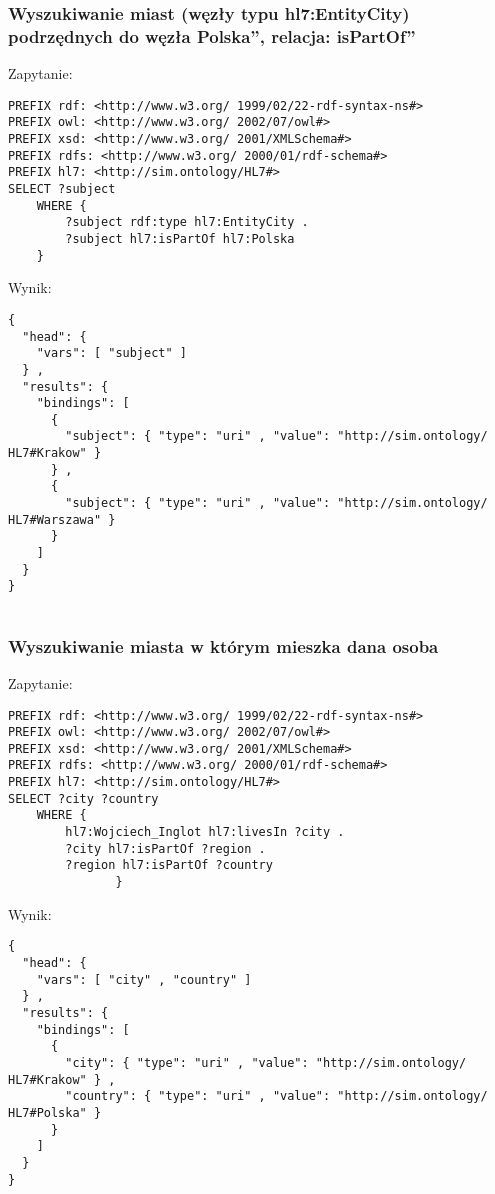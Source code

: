 \subsubsection{Wyszukiwanie miast (węzły typu hl7:EntityCity) podrzędnych do węzła \quotedblbase Polska\textquotedblright, relacja: \quotedblbase isPartOf\textquotedblright }

Zapytanie:
\begin{lstlisting}
PREFIX rdf: <http://www.w3.org/ 1999/02/22-rdf-syntax-ns#>
PREFIX owl: <http://www.w3.org/ 2002/07/owl#>
PREFIX xsd: <http://www.w3.org/ 2001/XMLSchema#>
PREFIX rdfs: <http://www.w3.org/ 2000/01/rdf-schema#>
PREFIX hl7: <http://sim.ontology/HL7#>
SELECT ?subject
	WHERE {      
		?subject rdf:type hl7:EntityCity .
		?subject hl7:isPartOf hl7:Polska
	}
\end{lstlisting}

Wynik:
\begin{lstlisting}
{
  "head": {
    "vars": [ "subject" ]
  } ,
  "results": {
    "bindings": [
      {
        "subject": { "type": "uri" , "value": "http://sim.ontology/ HL7#Krakow" }
      } ,
      {
        "subject": { "type": "uri" , "value": "http://sim.ontology/ HL7#Warszawa" }
      }
    ]
  }
}


\end{lstlisting}

\subsubsection{Wyszukiwanie miasta w którym mieszka dana osoba}

Zapytanie:
\begin{lstlisting}
PREFIX rdf: <http://www.w3.org/ 1999/02/22-rdf-syntax-ns#>
PREFIX owl: <http://www.w3.org/ 2002/07/owl#>
PREFIX xsd: <http://www.w3.org/ 2001/XMLSchema#>
PREFIX rdfs: <http://www.w3.org/ 2000/01/rdf-schema#>
PREFIX hl7: <http://sim.ontology/HL7#>
SELECT ?city ?country
	WHERE {
		hl7:Wojciech_Inglot hl7:livesIn ?city .
		?city hl7:isPartOf ?region .
		?region hl7:isPartOf ?country
	           }
\end{lstlisting}

Wynik:
\begin{lstlisting}
{
  "head": {
    "vars": [ "city" , "country" ]
  } ,
  "results": {
    "bindings": [
      {
        "city": { "type": "uri" , "value": "http://sim.ontology/ HL7#Krakow" } ,
        "country": { "type": "uri" , "value": "http://sim.ontology/ HL7#Polska" }
      }
    ]
  }
}
\end{lstlisting}

